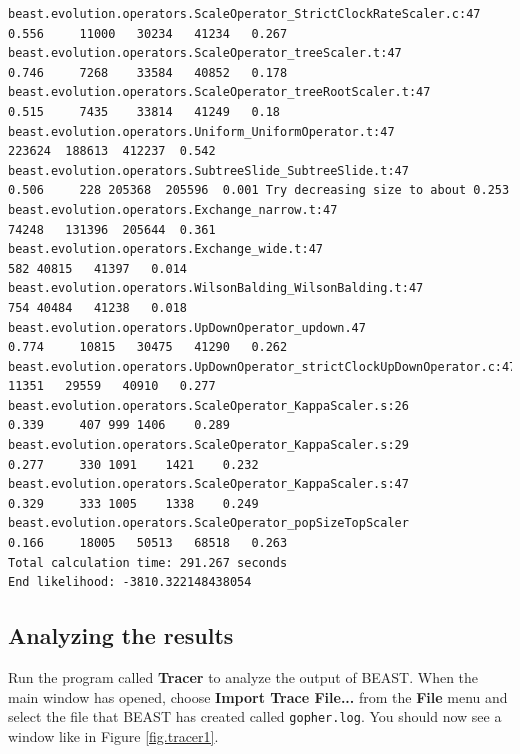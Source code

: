 \documentclass{article}
\begin{document}
{\begin{verbatim}
beast.evolution.operators.ScaleOperator_StrictClockRateScaler.c:47    0.556 	11000	30234	41234	0.267 
beast.evolution.operators.ScaleOperator_treeScaler.t:47               0.746 	7268	33584	40852	0.178 
beast.evolution.operators.ScaleOperator_treeRootScaler.t:47           0.515 	7435	33814	41249	0.18 
beast.evolution.operators.Uniform_UniformOperator.t:47                      	223624	188613	412237	0.542 
beast.evolution.operators.SubtreeSlide_SubtreeSlide.t:47              0.506 	228	205368	205596	0.001 Try decreasing size to about 0.253
beast.evolution.operators.Exchange_narrow.t:47                              	74248	131396	205644	0.361 
beast.evolution.operators.Exchange_wide.t:47                                	582	40815	41397	0.014 
beast.evolution.operators.WilsonBalding_WilsonBalding.t:47                  	754	40484	41238	0.018 
beast.evolution.operators.UpDownOperator_updown.47                    0.774 	10815	30475	41290	0.262 
beast.evolution.operators.UpDownOperator_strictClockUpDownOperator.c:470.788 	11351	29559	40910	0.277 
beast.evolution.operators.ScaleOperator_KappaScaler.s:26              0.339 	407	999	1406	0.289 
beast.evolution.operators.ScaleOperator_KappaScaler.s:29              0.277 	330	1091	1421	0.232 
beast.evolution.operators.ScaleOperator_KappaScaler.s:47              0.329 	333	1005	1338	0.249 
beast.evolution.operators.ScaleOperator_popSizeTopScaler              0.166 	18005	50513	68518	0.263 
Total calculation time: 291.267 seconds
End likelihood: -3810.322148438054
\end{verbatim}}

\subsection*{Analyzing the results}

Run the program called {\bf Tracer} to analyze the output of BEAST. When the main
window has opened, choose {\bf Import Trace File...} from the {\bf File} menu and select the file that
BEAST has created called \texttt{gopher.log}.
You should now see a window like in Figure \ref{fig.tracer1}.
\end{document}
